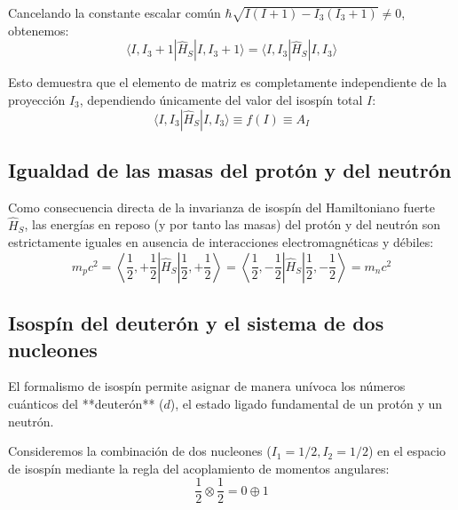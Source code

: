 Cancelando la constante escalar común $\hbar \sqrt{I(I+1) - I_3(I_3+1)} \neq 0$, obtenemos:
\begin{equation}
    \langle I, I_3+1 | \hat{H}_S | I, I_3+1 \rangle = \langle I, I_3 | \hat{H}_S | I, I_3 \rangle
\end{equation}

Esto demuestra que el elemento de matriz es completamente independiente de la proyección $I_3$, dependiendo únicamente del valor del isospín total $I$:
\begin{equation}
    \langle I, I_3 | \hat{H}_S | I, I_3 \rangle \equiv f(I) \equiv A_I
\end{equation}

\subsection{Igualdad de las masas del protón y del neutrón}

Como consecuencia directa de la invarianza de isospín del Hamiltoniano fuerte $\hat{H}_S$, las energías en reposo (y por tanto las masas) del protón y del neutrón son estrictamente iguales en ausencia de interacciones electromagnéticas y débiles:
\begin{equation}
    m_p c^2 = \left\langle \frac{1}{2}, +\frac{1}{2} \right| \hat{H}_S \left| \frac{1}{2}, +\frac{1}{2} \right\rangle = \left\langle \frac{1}{2}, -\frac{1}{2} \right| \hat{H}_S \left| \frac{1}{2}, -\frac{1}{2} \right\rangle = m_n c^2
\end{equation}

\subsection{Isospín del deuterón y el sistema de dos nucleones}

El formalismo de isospín permite asignar de manera unívoca los números cuánticos del **deuterón** ($d$), el estado ligado fundamental de un protón y un neutrón.

Consideremos la combinación de dos nucleones ($I_1 = 1/2, I_2 = 1/2$) en el espacio de isospín mediante la regla del acoplamiento de momentos angulares:
\begin{equation}
    \frac{1}{2} \otimes \frac{1}{2} = 0 \oplus 1
\end{equation}

